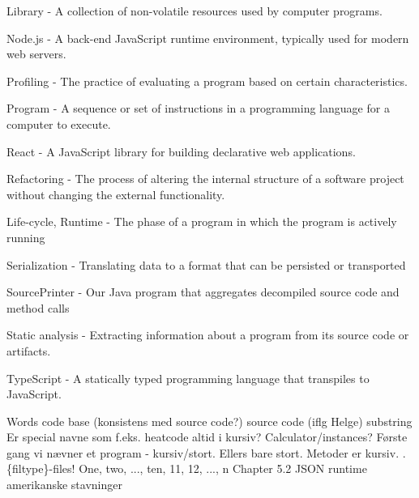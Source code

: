Library - A collection of non-volatile resources used by computer programs.

Node.js - A back-end JavaScript runtime environment, typically used for modern web servers.

Profiling - The practice of evaluating a program based on certain characteristics.

Program - A sequence or set of instructions in a programming language for a computer to execute.

React - A JavaScript library for building declarative web applications.

Refactoring - The process of altering the internal structure of a software project without changing the external functionality.

Life-cycle, Runtime - The phase of a program in which the program is actively running

Serialization - Translating data to a format that can be persisted or transported

SourcePrinter - Our Java program that aggregates decompiled source code and method calls

Static analysis - Extracting information about a program from its source code or artifacts.

TypeScript - A statically typed programming language that transpiles to JavaScript.



Words
code base (konsistens med source code?)
source code (iflg Helge)
substring
Er special navne som f.eks. heatcode altid i kursiv? Calculator/instances?
Første gang vi nævner et program - kursiv/stort. Ellers bare stort. Metoder er kursiv.
.\{filtype\}-files!
One, two, ..., ten, 11, 12, ..., n
Chapter 5.2
JSON
runtime
amerikanske stavninger